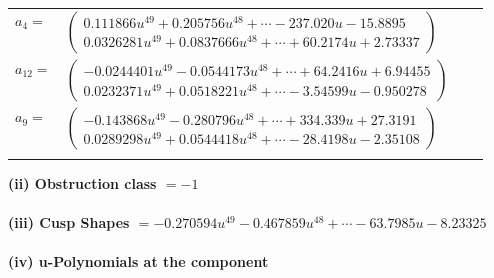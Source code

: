 \documentclass[1p]{elsarticle_modified}
\theoremstyle{definition}
\begin{document}
\begin{tabular}{m{7pt} m{180pt} m{7pt} m{180pt} }
\flushright $a_{4}=$&$\begin{pmatrix}0.111866 u^{49}+0.205756 u^{48}+\cdots-237.020 u-15.8895\\0.0326281 u^{49}+0.0837666 u^{48}+\cdots+60.2174 u+2.73337\end{pmatrix}$ \\
\flushright $a_{12}=$&$\begin{pmatrix}-0.0244401 u^{49}-0.0544173 u^{48}+\cdots+64.2416 u+6.94455\\0.0232371 u^{49}+0.0518221 u^{48}+\cdots-3.54599 u-0.950278\end{pmatrix}$ \\
\flushright $a_{9}=$&$\begin{pmatrix}-0.143868 u^{49}-0.280796 u^{48}+\cdots+334.339 u+27.3191\\0.0289298 u^{49}+0.0544418 u^{48}+\cdots-28.4198 u-2.35108\end{pmatrix}$\\&\end{tabular}
\flushleft \textbf{(ii) Obstruction class $= -1$}\\~\\
\flushleft \textbf{(iii) Cusp Shapes $= -0.270594 u^{49}-0.467859 u^{48}+\cdots-63.7985 u-8.23325$}\\~\\
\newpage\renewcommand{\arraystretch}{1}
\flushleft \textbf{(iv) u-Polynomials at the component}\newline \\
\end{document}
